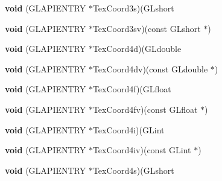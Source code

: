 \begin{DoxyCompactItemize}
\item 
\mbox{\label{struct_____g_ldispatch_table_rec_a722d1b33b7c81297dd667b59aaee7a5e}} 
{\bfseries void} (G\+L\+A\+P\+I\+E\+N\+T\+RY $\ast$Tex\+Coord3s)(G\+Lshort
\item 
\mbox{\label{struct_____g_ldispatch_table_rec_aedff077debfcd8e7469da1eaba4ee5b2}} 
{\bfseries void} (G\+L\+A\+P\+I\+E\+N\+T\+RY $\ast$Tex\+Coord3sv)(const G\+Lshort $\ast$)
\item 
\mbox{\label{struct_____g_ldispatch_table_rec_a4fb7506344431f1f4788bd068f35e1eb}} 
{\bfseries void} (G\+L\+A\+P\+I\+E\+N\+T\+RY $\ast$Tex\+Coord4d)(G\+Ldouble
\item 
\mbox{\label{struct_____g_ldispatch_table_rec_a2155836b5bb3dccdd95d90c362202810}} 
{\bfseries void} (G\+L\+A\+P\+I\+E\+N\+T\+RY $\ast$Tex\+Coord4dv)(const G\+Ldouble $\ast$)
\item 
\mbox{\label{struct_____g_ldispatch_table_rec_aaabab49611b68b6feeeb7da8eaf7e06c}} 
{\bfseries void} (G\+L\+A\+P\+I\+E\+N\+T\+RY $\ast$Tex\+Coord4f)(G\+Lfloat
\item 
\mbox{\label{struct_____g_ldispatch_table_rec_ade7a43b00faa47ad2c51c5737e961d45}} 
{\bfseries void} (G\+L\+A\+P\+I\+E\+N\+T\+RY $\ast$Tex\+Coord4fv)(const G\+Lfloat $\ast$)
\item 
\mbox{\label{struct_____g_ldispatch_table_rec_abf68401cb90cf565b21d46a81169ca86}} 
{\bfseries void} (G\+L\+A\+P\+I\+E\+N\+T\+RY $\ast$Tex\+Coord4i)(G\+Lint
\item 
\mbox{\label{struct_____g_ldispatch_table_rec_aa248c097391c6cc7e0efc7015409670f}} 
{\bfseries void} (G\+L\+A\+P\+I\+E\+N\+T\+RY $\ast$Tex\+Coord4iv)(const G\+Lint $\ast$)
\item 
\mbox{\label{struct_____g_ldispatch_table_rec_ae03d6425ad050859b570f70885d0fbc5}} 
{\bfseries void} (G\+L\+A\+P\+I\+E\+N\+T\+RY $\ast$Tex\+Coord4s)(G\+Lshort

\end{DoxyCompactItemize}
